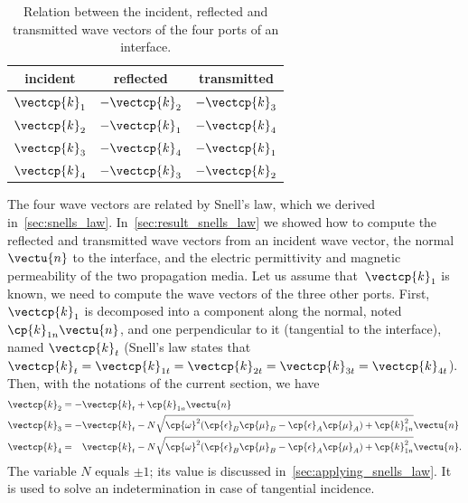 \begin{refsection}
\begin{table}
    \centering
    \begin{tabular}{ccc}
        \toprule
        incident & reflected & transmitted \\
        \midrule
        $\vectcp{k}_1$ & $-\vectcp{k}_2$ & $-\vectcp{k}_3$ \\
        $\vectcp{k}_2$ & $-\vectcp{k}_1$ & $-\vectcp{k}_4$ \\
        $\vectcp{k}_3$ & $-\vectcp{k}_4$ & $-\vectcp{k}_1$ \\
        $\vectcp{k}_4$ & $-\vectcp{k}_3$ & $-\vectcp{k}_2$ \\
        \bottomrule
    \end{tabular}
    \caption{Relation between the incident, reflected and transmitted wave vectors of the four ports of an interface.}
    \label{tab:inc_ref_tra}
\end{table}
The four wave vectors are related by Snell's law, which we derived in~\cref{sec:snells_law}.
In~\cref{sec:result_snells_law} we showed how to compute the reflected and transmitted wave vectors from an incident wave vector, the normal~$\vectu{n}$ to the interface, and the electric permittivity and magnetic permeability of the two propagation media.
Let us assume that~$\vectcp{k}_1$ is known, we need to compute the wave vectors of the three other ports.
First, $\vectcp{k}_1$ is decomposed into a component along the normal, noted $\cp{k}_{1n}\vectu{n}$, and one perpendicular to it (tangential to the interface), named $\vectcp{k}_t$
(Snell's law states that $\vectcp{k}_t=\vectcp{k}_{1t}=\vectcp{k}_{2t}=\vectcp{k}_{3t}=\vectcp{k}_{4t}$).
Then, with the notations of the current section, we have
\begin{align}
    \vectcp{k}_2
    &=
    -\vectcp{k}_t
    +
    \cp{k}_{1n}
    \vectu{n}
    \\
    \vectcp{k}_3
    &=
    -\vectcp{k}_t
    -
    N%
    \sqrt{\cp{\omega}^2 (\cp{\epsilon}_B \cp{\mu}_B - \cp{\epsilon}_A \cp{\mu}_A) + \cp{k}_{1n}^2}
    \vectu{n}
    \\
    \vectcp{k}_4
    &=
    \phantom{\mathrel{-}}
    \vectcp{k}_t
    -
    N%
    \sqrt{\cp{\omega}^2 (\cp{\epsilon}_B \cp{\mu}_B - \cp{\epsilon}_A \cp{\mu}_A) + \cp{k}_{1n}^2}
    \vectu{n}
    \text{.}
\end{align}
The variable $N$ equals $\pm1$; its value is discussed in~\cref{sec:applying_snells_law}.
It is used to solve an indetermination in case of tangential incidence.

\end{refsection}
